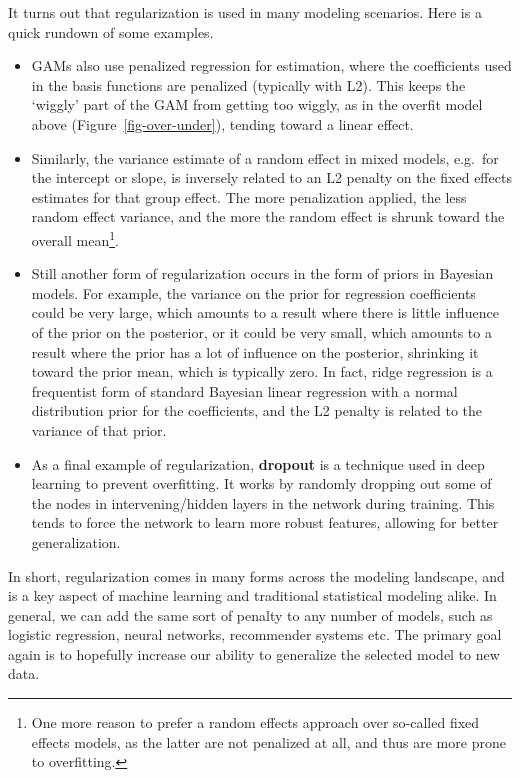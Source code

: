 \documentclass[
  letterpaper,
]{krantz}
\begin{document}
It turns out that regularization is used in many modeling scenarios.
Here is a quick rundown of some examples.

\begin{itemize}
\item
  GAMs also use penalized regression for estimation, where the
  coefficients used in the basis functions are penalized (typically with
  L2). This keeps the `wiggly' part of the GAM from getting too wiggly,
  as in the overfit model above (Figure~\ref{fig-over-under}), tending
  toward a linear effect.
\item
  Similarly, the variance estimate of a random effect in mixed models,
  e.g.~for the intercept or slope, is inversely related to an L2 penalty
  on the fixed effects estimates for that group effect. The more
  penalization applied, the less random effect variance, and the more
  the random effect is shrunk toward the overall mean\footnote{One more
    reason to prefer a random effects approach over so-called fixed
    effects models, as the latter are not penalized at all, and thus are
    more prone to overfitting.}.
\end{itemize}

\begin{itemize}
\item
  Still another form of regularization occurs in the form of priors in
  Bayesian models. For example, the variance on the prior for regression
  coefficients could be very large, which amounts to a result where
  there is little influence of the prior on the posterior, or it could
  be very small, which amounts to a result where the prior has a lot of
  influence on the posterior, shrinking it toward the prior mean, which
  is typically zero. In fact, ridge regression is a frequentist form of
  standard Bayesian linear regression with a normal distribution prior
  for the coefficients, and the L2 penalty is related to the variance of
  that prior.
\item
  As a final example of regularization, \textbf{dropout} is a technique
  used in deep learning to prevent overfitting. It works by randomly
  dropping out some of the nodes in intervening/hidden layers in the
  network during training. This tends to force the network to learn more
  robust features, allowing for better generalization.
\end{itemize}

In short, regularization comes in many forms across the modeling
landscape, and is a key aspect of machine learning and traditional
statistical modeling alike. In general, we can add the same sort of
penalty to any number of models, such as logistic regression, neural
networks, recommender systems etc. The primary goal again is to
hopefully increase our ability to generalize the selected model to new
data.
\end{document}
